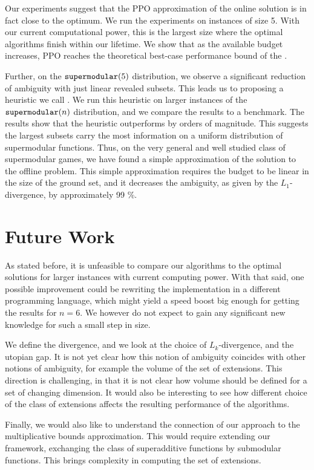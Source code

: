Our experiments suggest that the PPO approximation of the online solution is in fact close to the optimum.
We run the experiments on instances of size 5.
With our current computational power, this is the largest size where the optimal algorithms finish within our lifetime.
We show that as the available budget increases, PPO reaches the theoretical best-case performance bound of the \algRO{}.

Further, on the $ \supermodular[5] $ distribution, we observe a significant reduction of ambiguity with just linear revealed subsets.
This leads us to proposing a heuristic we call .
We run this heuristic on larger instances of the $ \supermodular $ distribution, and we compare the results to a \algRand{} benchmark.
The results show that the  heuristic outperforms \algRand{} by orders of magnitude.
This suggests the largest subsets carry the most information on a uniform distribution of supermodular functions.
Thus, on the very general and well studied class of supermodular games, we have found a simple approximation of the solution to the offline problem.
This simple approximation requires the budget to be linear in the size of the ground set, and it decreases the ambiguity, as given by the $ L_1 $-divergence, by approximately 99 \%.

\section*{Future Work}

As stated before, it is unfeasible to compare our algorithms to the optimal solutions for larger instances with current computing power.
With that said, one possible improvement could be rewriting the implementation in a different programming language, which might yield a speed boost big enough for getting the results for $ n=6 $.
We however do not expect to gain any significant new knowledge for such a small step in size.

We define the divergence, and we look at the choice of $ L_k $-divergence, and the utopian gap.
It is not yet clear how this notion of ambiguity coincides with other notions of ambiguity, for example the volume of the set of extensions.
This direction is challenging, in that it is not clear how volume should be defined for a set of changing dimension.
It would also be interesting to see how different choice of the class of extensions affects the resulting performance of the algorithms.

Finally, we would also like to understand the connection of our approach to the multiplicative bounds approximation.
This would require extending our framework, exchanging the class of superadditive functions by submodular functions.
This brings complexity in computing the set of extensions.
